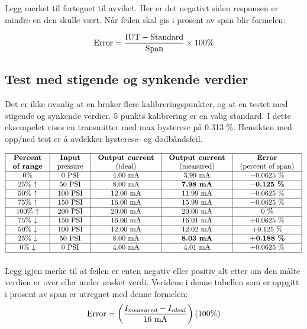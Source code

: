 Legg merket til fortegnet til avviket. Her er det negativt siden responsen er mindre en den skulle vært. Når feilen skal gis i prosent av span blir formelen:


$$\hbox{Error} = {\hbox{IUT} - \hbox{Standard} \over \hbox{Span}} \times 100\%$$




\filbreak
\subsection{Test med stigende og synkende verdier}

Det er ikke uvanlig at en bruker flere kalibreringspunkter, og at en testet med stigende og synkende verdier. 5 punkts kalibrering er en valig standard. I dette eksempelet vises en transmitter med max hysterese på 0.313 \%. Hensikten med opp/ned test er å avdekker hysterese- og dødbåndsfeil. 


$$\vbox{\offinterlineskip
\halign{\strut
\vrule \quad\hfil # \ \hfil & 
\vrule \quad\hfil # \ \hfil & 
\vrule \quad\hfil # \ \hfil & 
\vrule \quad\hfil # \ \hfil & 
\vrule \quad\hfil # \ \hfil \vrule \cr
\noalign{\hrule}
%
\textbf{Percent} & \textbf{Input} & \textbf{Output current} & \textbf{Output current} & \textbf{Error} \cr
%
\textbf{of range} & pressure & (ideal) & (measured) & (percent of span) \cr
%
\noalign{\hrule}
%
0\% & 0 PSI & 4.00 mA & 3.99 mA & $-0.0625$ \% \cr
%
\noalign{\hrule}
%
25\% $\uparrow$ & 50 PSI & 8.00 mA & \textbf{7.98 mA} & \textbf{$-$0.125 \%} \cr
%
\noalign{\hrule}
%
50\% $\uparrow$ & 100 PSI & 12.00 mA & 11.99 mA & $-0.0625$ \% \cr
%
\noalign{\hrule}
%
75\% $\uparrow$ & 150 PSI & 16.00 mA & 15.99 mA & $-0.0625$ \% \cr
%
\noalign{\hrule}
%
100\% $\uparrow$ & 200 PSI & 20.00 mA & 20.00 mA & 0 \% \cr
%
\noalign{\hrule}
%
75\% $\downarrow$ & 150 PSI & 16.00 mA & 16.01 mA & +0.0625 \% \cr
%
\noalign{\hrule}
%
50\% $\downarrow$ & 100 PSI & 12.00 mA & 12.02 mA & +0.125 \% \cr
%
\noalign{\hrule}
%
25\% $\downarrow$ & 50 PSI & 8.00 mA & \textbf{8.03 mA} & \textbf{+0.188 \%} \cr
%
\noalign{\hrule}
%
0\% $\downarrow$ & 0 PSI & 4.00 mA & 4.01 mA & +0.0625 \% \cr
%
\noalign{\hrule}
} %
}$$ %

Legg igjen merke til at feilen er enten negativ eller positiv alt etter om den målte verdien er over eller under ønsket verdi. Veridene i denne tabellen som er oppgitt i prosent av span er utregnet med denne formelen:
$$\hbox{Error} = \left( {{I_{measured} - I_{ideal}} \over 16 \hbox{ mA}} \right)  \left( 100 \% \right)$$

